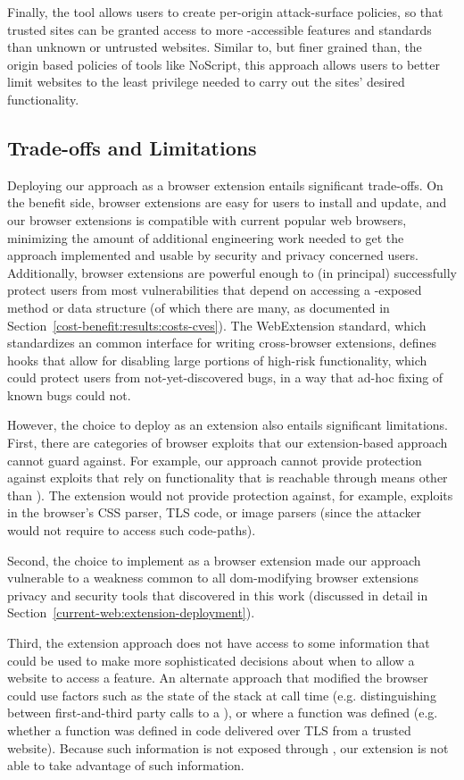 Finally, the tool allows users to create per-origin attack-surface policies,
so that trusted sites can be granted access to more \JS-accessible
features and standards than unknown or untrusted websites.  Similar to, but
finer grained than, the origin based policies of tools like NoScript, this
approach allows users to better limit websites to the least privilege
needed to carry out the sites' desired functionality.


\subsection{Trade-offs and Limitations}
Deploying our approach as a browser extension entails significant trade-offs.
On the benefit side, browser extensions are easy for users to install and update,
and our browser extensions is compatible with current popular web browsers,
minimizing the amount of additional engineering work needed to get the approach
implemented and usable by security and privacy concerned users.  Additionally,
browser extensions are powerful enough to (in principal) successfully protect
users from most vulnerabilities that depend on accessing a \JS-exposed method
or data structure (of which there are many, as documented in
Section~\ref{cost-benefit:results:costs-cves}).  The WebExtension standard, which
standardizes an common interface for writing cross-browser extensions,
defines hooks that allow for disabling large portions of high-risk
functionality, which could protect users from not-yet-discovered bugs, in a way
that ad-hoc fixing of known bugs could not.

However, the choice to deploy as an extension also entails significant
limitations.  First, there are categories of browser exploits
that our extension-based approach cannot guard against.  For example, our
approach cannot provide protection against exploits that rely on \WAPI
functionality that is reachable through means other than \JS).
The extension would not provide protection against, for example,
exploits in the browser's CSS parser, TLS code, or image parsers (since the
attacker would not require \JS to access such code-paths).

Second, the choice to implement as a browser extension made our approach
vulnerable to a weakness common to all \gls{dom}-modifying browser extensions
privacy and security tools that discovered in this work (discussed in detail in
Section~\ref{current-web:extension-deployment}).

Third, the extension approach does not have access to some
information that could be used to make more sophisticated decisions about
when to allow a website to access a feature.  An alternate approach that
modified the browser could use factors such as the state of the stack at call
time (e.g. distinguishing between first-and-third party calls to a \WAS), or
where a function was defined (e.g. whether a function was defined in \JS code
delivered over TLS from a trusted website).  Because such information is not
exposed through \JS, our extension is not able to take advantage of
such information.


